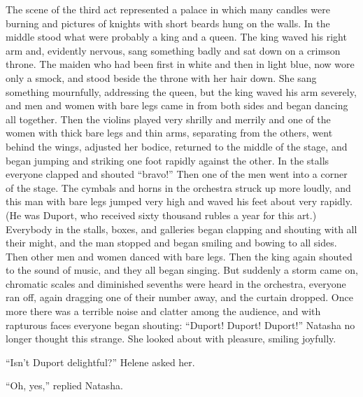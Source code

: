 The scene of the third act represented a palace in which many
candles were burning and pictures of knights with short beards
hung on the walls. In the middle stood what were probably a king
and a queen. The king waved his right arm and, evidently nervous,
sang something badly and sat down on a crimson throne. The maiden
who had been first in white and then in light blue, now wore only
a smock, and stood beside the throne with her hair down. She sang
something mournfully, addressing the queen, but the king waved
his arm severely, and men and women with bare legs came in from
both sides and began dancing all together. Then the violins
played very shrilly and merrily and one of the women with thick
bare legs and thin arms, separating from the others, went behind
the wings, adjusted her bodice, returned to the middle of the
stage, and began jumping and striking one foot rapidly against
the other. In the stalls everyone clapped and shouted ``bravo!''
Then one of the men went into a corner of the stage. The cymbals
and horns in the orchestra struck up more loudly, and this man
with bare legs jumped very high and waved his feet about very
rapidly. (He was Duport, who received sixty thousand rubles a
year for this art.) Everybody in the stalls, boxes, and galleries
began clapping and shouting with all their might, and the man
stopped and began smiling and bowing to all sides. Then other men
and women danced with bare legs. Then the king again shouted to
the sound of music, and they all began singing. But suddenly a
storm came on, chromatic scales and diminished sevenths were
heard in the orchestra, everyone ran off, again dragging one of
their number away, and the curtain dropped. Once more there was a
terrible noise and clatter among the audience, and with rapturous
faces everyone began shouting: ``Duport! Duport! Duport!''
Natasha no longer thought this strange. She looked about with
pleasure, smiling joyfully.

``Isn't Duport delightful?'' Helene asked her.

``Oh, yes,'' replied Natasha.


